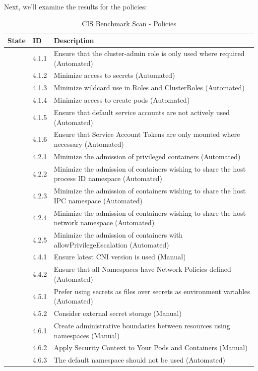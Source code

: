 \pagebreak

Next, we'll examine the results for the policies:

\begin{table}[hp]
  \centering
  \caption{CIS Benchmark Scan - Policies}
    \begin{tabular}{| l | l | p{11cm} |}
    \hline
    State & ID & Description \\
    \hline\hline
    [FAIL] & 4.1.1 & Ensure that the cluster-admin role is only used where required (Automated) \\
    \hline
    [PASS] & 4.1.2 & Minimize access to secrets (Automated) \\
    \hline
    [PASS] & 4.1.3 & Minimize wildcard use in Roles and ClusterRoles (Automated) \\
    \hline
    [PASS] & 4.1.4 & Minimize access to create pods (Automated) \\
    \hline
    [PASS] & 4.1.5 & Ensure that default service accounts are not actively used (Automated) \\
    \hline
    [FAIL] & 4.1.6 & Ensure that Service Account Tokens are only mounted where necessary (Automated) \\
    \hline
    [PASS] & 4.2.1 & Minimize the admission of privileged containers (Automated) \\
    \hline
    [PASS] & 4.2.2 & Minimize the admission of containers wishing to share the host process ID namespace (Automated) \\
    \hline
    [PASS] & 4.2.3 & Minimize the admission of containers wishing to share the host IPC namespace (Automated) \\
    \hline
    [PASS] & 4.2.4 & Minimize the admission of containers wishing to share the host network namespace (Automated) \\
    \hline
    [PASS] & 4.2.5 & Minimize the admission of containers with allowPrivilegeEscalation (Automated) \\
    \hline
    [WARN] & 4.4.1 & Ensure latest CNI version is used (Manual) \\
    \hline
    [PASS] & 4.4.2 & Ensure that all Namespaces have Network Policies defined (Automated) \\
    \hline
    [PASS] & 4.5.1 & Prefer using secrets as files over secrets as environment variables (Automated) \\
    \hline
    [WARN] & 4.5.2 & Consider external secret storage (Manual) \\
    \hline
    [WARN] & 4.6.1 & Create administrative boundaries between resources using namespaces (Manual) \\
    \hline
    [WARN] & 4.6.2 & Apply Security Context to Your Pods and Containers (Manual) \\
    \hline
    [PASS] & 4.6.3 & The default namespace should not be used (Automated) \\
    \hline
    \end{tabular}%
  \label{tab:aksScanP}%
\end{table}%

